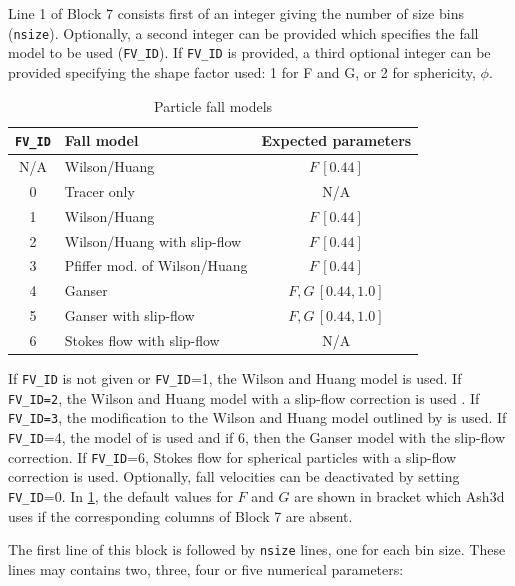 Line 1 of Block 7 consists first of an integer giving the number of size bins
(\texttt{nsize}).
Optionally, a second integer can be provided which specifies the fall model to be used
(\texttt{FV\_ID}).
If \texttt{FV\_ID} is provided, a third optional integer can be provided specifying
the shape factor used: 1 for F and G, or 2 for sphericity, $\phi$.
\begin{table}[htbp]
\begin{center}
\begin{tabular}{| c | l | c | }
\hline
\texttt{FV\_ID} & Fall model & Expected parameters\\
\hline
N/A & Wilson/Huang & $F \,[0.44]$ \\
0 &  Tracer only & N/A \\
1 &  Wilson/Huang & $F\, [0.44]$ \\
2 &  Wilson/Huang with slip-flow & $F\, [0.44]$ \\
3 &  Pfiffer mod. of Wilson/Huang & $F\, [0.44]$ \\
4 &  Ganser & $F,G \,[0.44,1.0]$ \\
5 &  Ganser with slip-flow & $F,G \,[0.44,1.0]$ \\
6 &  Stokes flow with slip-flow & N/A \\
\hline
\end{tabular}
\caption{\label{tab:FallModelOpt}Particle fall models}
\end{center}
\end{table}

If \texttt{FV\_ID} is not given or \texttt{FV\_ID}=1, the Wilson and Huang \cite{Wilson1979}
model is used.
If \texttt{FV\_ID=2}, the Wilson and Huang model with a slip-flow correction is used \cite{Seinfeld2006}.
If \texttt{FV\_ID=3}, the modification to the Wilson and Huang model outlined
by \cite{Pfeiffer2005} is used. If \texttt{FV\_ID}=4, the model of \cite{Ganser1993} is used
and if 6, then the Ganser model with the slip-flow correction. If
\texttt{FV\_ID}=6, Stokes flow for spherical particles with a slip-flow correction is used.
Optionally, fall velocities can be deactivated by setting \texttt{FV\_ID}=0.  In \ref{tab:FallModelOpt},
the default values for $F$ and $G$ are shown in bracket which Ash3d uses if the corresponding
columns of Block 7 are absent.

The first line of this block is followed by \texttt{nsize} lines, one for each bin size.
These lines may contains two, three, four or five numerical parameters:


